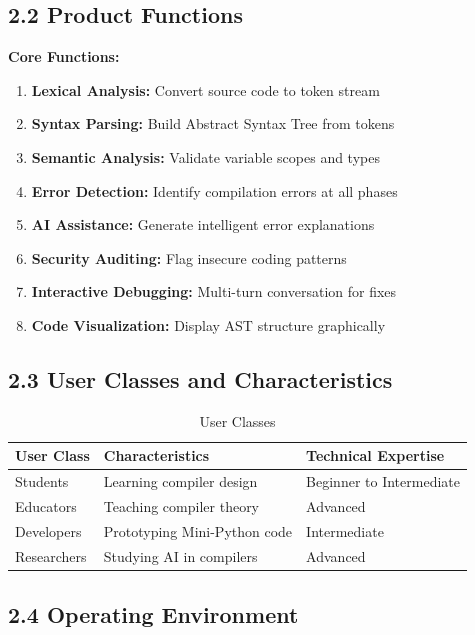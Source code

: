 \documentclass[a4paper,11pt]{article}
\begin{document}
\subsection{2.2 Product Functions}

\textbf{Core Functions:}
\begin{enumerate}
    \item \textbf{Lexical Analysis:} Convert source code to token stream
    \item \textbf{Syntax Parsing:} Build Abstract Syntax Tree from tokens
    \item \textbf{Semantic Analysis:} Validate variable scopes and types
    \item \textbf{Error Detection:} Identify compilation errors at all phases
    \item \textbf{AI Assistance:} Generate intelligent error explanations
    \item \textbf{Security Auditing:} Flag insecure coding patterns
    \item \textbf{Interactive Debugging:} Multi-turn conversation for fixes
    \item \textbf{Code Visualization:} Display AST structure graphically
\end{enumerate}

\subsection{2.3 User Classes and Characteristics}

\begin{table}[H]
\centering
\begin{tabularx}{\textwidth}{|l|X|X|}
\hline
\rowcolor{blue!10}
\textbf{User Class} & \textbf{Characteristics} & \textbf{Technical Expertise} \\
\hline
Students & Learning compiler design & Beginner to Intermediate \\
\hline
Educators & Teaching compiler theory & Advanced \\
\hline
Developers & Prototyping Mini-Python code & Intermediate \\
\hline
Researchers & Studying AI in compilers & Advanced \\
\hline
\end{tabularx}
\caption{User Classes}
\end{table}

\subsection{2.4 Operating Environment}
\end{document}
